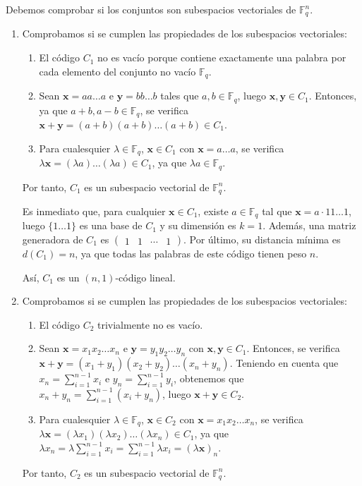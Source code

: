 Debemos comprobar si los conjuntos son subespacios vectoriales de $\mathbb{F}_q^n$.

\begin{enumerate}[label=\alph*)]
	\item Comprobamos si se cumplen las propiedades de los subespacios vectoriales:
		\begin{enumerate}[label=\arabic*)]
			\item El código $C_1$ no es vacío porque contiene exactamente una palabra por cada elemento del conjunto no vacío $\mathbb{F}_q$.
			\item Sean $\textbf{x} = aa\hdots a$ e $\textbf{y} = bb\hdots b$ tales que $a,b \in \mathbb{F}_q$, luego $\textbf{x}, \textbf{y} \in C_1$. Entonces, ya que $a+b, a-b \in \mathbb{F}_q$, se verifica $\textbf{x}+\textbf{y} = (a+b)(a+b)\hdots(a+b) \in C_1$.
			\item Para cualesquier $\lambda\in\mathbb{F}_q$, $\textbf{x}\in C_1$ con $\textbf{x} = a\hdots a$, se verifica $\lambda\textbf{x} = (\lambda a)\hdots(\lambda a) \in C_1$, ya que $\lambda a \in \mathbb{F}_q$.
		\end{enumerate}
		Por tanto, $C_1$ es un subespacio vectorial de $\mathbb{F}_q^n$.
		
		Es inmediato que, para cualquier $\textbf{x}\in C_1$, existe $a\in\mathbb{F}_q$ tal que $\textbf{x} = a\cdot 11\hdots1$, luego $\{1\hdots1\}$ es una base de $C_1$ y su dimensión es $k = 1$. Además, una matriz generadora de $C_1$ es $\begin{pmatrix}
			1 & 1 & \cdots & 1
		\end{pmatrix}$. Por último, su distancia mínima es $d(C_1) = n$, ya que todas las palabras de este código tienen peso $n$.
		
		Así, $C_1$ es un $(n, 1)$-código lineal.
	
	\item Comprobamos si se cumplen las propiedades de los subespacios vectoriales:
		\begin{enumerate}[label=\arabic*)]
			\item El código $C_2$ trivialmente no es vacío.
			\item Sean $\textbf{x} = x_1x_2\hdots x_n$ e $\textbf{y} = y_1y_2\hdots y_n$ con $\textbf{x}, \textbf{y} \in C_1$. Entonces, se verifica $\textbf{x}+\textbf{y} = (x_1+y_1)(x_2+y_2)\hdots(x_n+y_n)$. Teniendo en cuenta que $x_n = \sum_{i=1}^{n-1}x_i$ e $y_n = \sum_{i=1}^{n-1}y_i$, obtenemos que $x_n + y_n = \sum_{i=1}^{n-1}(x_i + y_n)$, luego $\textbf{x} + \textbf{y} \in C_2$.
			\item Para cualesquier $\lambda\in\mathbb{F}_q$, $\textbf{x}\in C_2$ con $\textbf{x} = x_1x_2\hdots x_n$, se verifica $\lambda\textbf{x} = (\lambda x_1)(\lambda x_2)\hdots(\lambda x_n) \in C_1$, ya que $\lambda x_n = \lambda\sum_{i=1}^{n-1}x_i = \sum_{i=1}^{n-1}\lambda x_i = (\lambda\textbf{x})_n$.
		\end{enumerate}
		Por tanto, $C_2$ es un subespacio vectorial de $\mathbb{F}_q^n$.
		

\end{enumerate}
